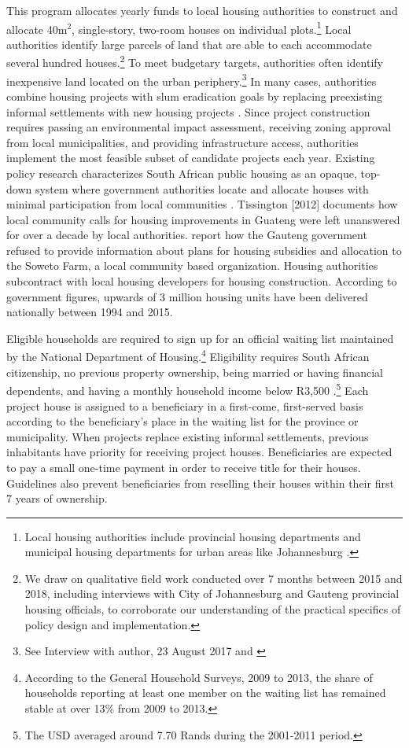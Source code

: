 \documentclass[12pt]{article}
\begin{document}
This program allocates yearly funds to local housing authorities to construct and allocate 40m$^2$, single-story, two-room houses on individual plots.\footnote{Local housing authorities include provincial housing departments and municipal housing departments for urban areas like Johannesburg \citep{dhsreports}.}  Local authorities identify large parcels of land that are able to each accommodate several hundred houses.\footnote{We draw on qualitative field work conducted over 7 months between 2015 and 2018, including interviews with City of Johannesburg and Gauteng provincial housing officials, to corroborate our understanding of the practical specifics of policy design and implementation.}  To meet budgetary targets, authorities often identify inexpensive land located on the urban periphery.\footnote{See Interview with author, 23 August 2017 and \cite{dhsreports}}  In many cases, authorities combine housing projects with slum eradication goals by replacing preexisting informal settlements with new housing projects \citep{hofmeyr2008risk}.  Since project construction requires passing an environmental impact assessment, receiving zoning approval from local municipalities, and providing infrastructure access, authorities implement the most feasible subset of candidate projects each year.  Existing policy research characterizes South African public housing as an opaque, top-down system where government authorities locate and allocate houses with minimal participation from local communities \citep{seriq}.  Tissington [2012] documents how local community calls for housing improvements in Guateng were left unanswered for over a decade by local authorities.  \cite{seriq} report how the Gauteng government refused to provide information about plans for housing subsidies and allocation to the Soweto Farm, a local community based organization.   Housing authorities subcontract with local housing developers for housing construction.  According to government figures, upwards of 3 million housing units have been delivered nationally between 1994 and 2015.


Eligible households are required to sign up for an official waiting list maintained by the National Department of Housing.\footnote{According to the General Household Surveys, 2009 to 2013, the share of households reporting at least one member on the waiting list has remained stable at over 13\% from 2009 to 2013.}  Eligibility requires South African citizenship, no previous property ownership, being married or having financial dependents, and having a monthly household income below R3,500 \citep{seriq}.\footnote{The USD averaged around 7.70 Rands during the 2001-2011 period.}  Each project house is assigned to a beneficiary in a first-come, first-served basis according to the beneficiary's place in the waiting list for the province or municipality. When projects replace existing informal settlements, previous inhabitants have priority for receiving project houses.  Beneficiaries are expected to pay a small one-time payment in order to receive title for their houses.  Guidelines also prevent beneficiaries from reselling their houses within their first 7 years of ownership.   %
\end{document}

